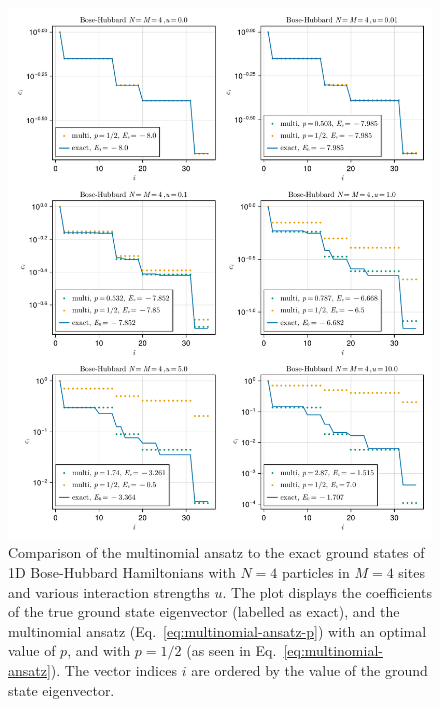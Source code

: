 \documentclass[11pt, article]{amsart}
\begin{document}
\begin{figure}
  \includegraphics[width=\textwidth]{example}
  \caption{\label{fig:example}
    Comparison of the multinomial ansatz to the exact ground states of 1D Bose-Hubbard Hamiltonians with $N=4$ particles in $M=4$ sites and various interaction strengths $u$. The plot displays the coefficients of the true ground state eigenvector (labelled as exact), and the multinomial ansatz (Eq.~\eqref{eq:multinomial-ansatz-p}) with an optimal value of $p$, and with $p=1/2$ (as seen in Eq.~\eqref{eq:multinomial-ansatz}). The vector indices $i$ are ordered by the value of the ground state eigenvector.
  }
\end{figure}
\end{document}
